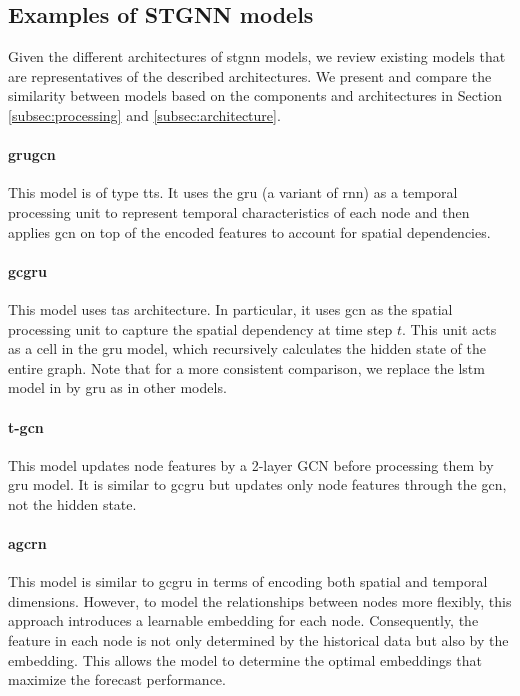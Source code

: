 
\subsection{Examples of STGNN models}\label{subsec:exampleSTGNN}
Given the different architectures of \acrshort{stgnn} models, we review  existing models that are representatives of the 
 described architectures. We present and compare the similarity between models based on the components and architectures in Section \ref{subsec:processing} and \ref{subsec:architecture}.

\paragraph{\acrshort{grugcn}~\cite{gao_equivalence_2022}} This model is of type \acrshort{tts}. It uses the \acrfull{gru} (a variant of \acrshort{rnn}) as a temporal processing unit to represent temporal characteristics of each node and then applies \acrshort{gcn} on top of the encoded features to account for spatial dependencies.

\paragraph{\acrshort{gcgru}~\cite{arastehfar_short-term_2022}} This model uses \acrshort{tas} architecture. In particular, it uses \acrshort{gcn} as the spatial processing unit to capture the spatial dependency at time step $t$. This unit acts as a cell in the \acrshort{gru} model, which recursively calculates the hidden state of the entire graph. Note that for a more consistent comparison, we replace the \acrfull{lstm} model in \cite{arastehfar_short-term_2022} by \acrshort{gru} as in other models.

\paragraph{\acrshort{t-gcn}~\cite{huang_gated_2023}} This model updates node features by a 2-layer GCN before processing them by \acrshort{gru} model. It is similar to \acrshort{gcgru} but updates only node features through the \acrshort{gcn}, not the hidden state.

\paragraph{\acrshort{agcrn}~\cite{bai_adaptive_2020}} This model is similar to \acrshort{gcgru} in terms of encoding both spatial and temporal dimensions. However, to model the relationships between nodes more flexibly, this approach introduces a learnable embedding for each node. Consequently, the feature in each node is not only determined by the historical data but also by the embedding. This allows the model to determine the optimal embeddings that maximize the forecast performance.

